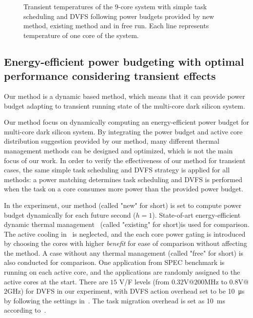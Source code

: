 \begin{figure}[htb]
{  }
  \caption{Transient temperatures of the $9$-core system with simple task scheduling and DVFS following power budgets provided by new method, existing method and in free run. Each line represents temperature of one core of the system.}
  \label{fig:transient_ppw_temperature}
\end{figure}

\subsection{Energy-efficient power budgeting with optimal performance considering transient effects}
Our method is a dynamic based method, which means that it can provide power budget adapting to transient running state of the multi-core dark silicon system.

Our method focus on dynamically computing an energy-efficient power budget for multi-core dark silicon system. By integrating the power budget and active core distribution suggestion provided by our method, many different thermal management methods can be designed and optimized, which is not the main focus of our work. In order to verify the effectiveness of our method for transient cases, the same simple task scheduling and DVFS strategy is applied for all methods: a power matching determines task scheduling and DVFS is performed when the task on a core consumes more power than the provided power budget.

In the experiment, our method (called "new" for short) is set to compute power budget dynamically for each future second ($h=1$). State-of-art energy-efficient dynamic thermal management~\cite{Hanumaiah:TCOMP'14} (called "existing" for short)is used for comparison. The active cooling in~\cite{Hanumaiah:TCOMP'14} is neglected, and the each core power gating is introduced by choosing the cores with higher \emph{benefit} for ease of comparison without affecting the method. A case without any thermal management (called "free" for short) is also conducted for comparison. One application from SPEC benchmark is running on each active core, and the applications are randomly assigned to the active cores at the start. There are $15$ V/F levels (from $0.32$V@$200$MHz to $0.8$V@$2$GHz) for DVFS in our experiment, with DVFS action overhead set to be \SI{10}{\us} by following the settings in~\cite{Lu:MICRO'05}. The task migration overhead is set as \SI{10}{\ms} according to~\cite{Cuesta:ISVLSI'10}.

